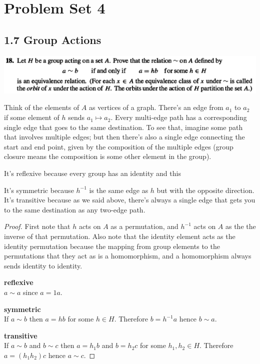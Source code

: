 
\section*{Problem  Set 4}

\subsection*{1.7 Group Actions}


\begin{mdframed}
\includegraphics[width=400pt]{img/abstract-algebra--nf--4-bc71.png}
\end{mdframed}

\begin{intuition}
  Think of the elements of $A$ as vertices of a graph. There's an edge from $a_1$ to $a_2$ if some
  element of $h$ sends $a_1 \mapsto a_2$. Every multi-edge path has a corresponding single edge that goes
  to the same destination. To see that, imagine some path that involves multiple edges; but then
  there's also a single edge connecting the start and end point, given by the composition of the
  multiple edges (group closure means the composition is some other element in the group).

  It's reflexive because every group has an identity and this

  It's symmetric because $h^{-1}$ is the same edge as $h$ but with the opposite direction. It's
  transitive because as we said above, there's always a single edge that gets you to the same
  destination as any two-edge path.
\end{intuition}

\begin{proof}
  First note that $h$ acts on $A$ as a permutation, and $h^{-1}$ acts on $A$ as the the inverse of
  that permutation. Also note that the identity element acts as the identity permutation because
  the mapping from group elements to the permutations that they act as is a homomorphism, and a
  homomorphism always sends identity to identity.

  {\bf reflexive}\\
  $a \sim a$ since $a = 1a$.

  {\bf symmetric}\\
  If $a \sim b$ then $a = hb$ for some $h \in H$. Therefore $b = h^{-1}a$ hence $b \sim a$.

  {\bf transitive}\\
  If $a \sim b$ and $b \sim c$ then $a = h_1b$ and $b = h_2c$ for some $h_1, h_2 \in H$.
  Therefore $a = (h_1h_2)c$ hence $a \sim c$.
\end{proof}


